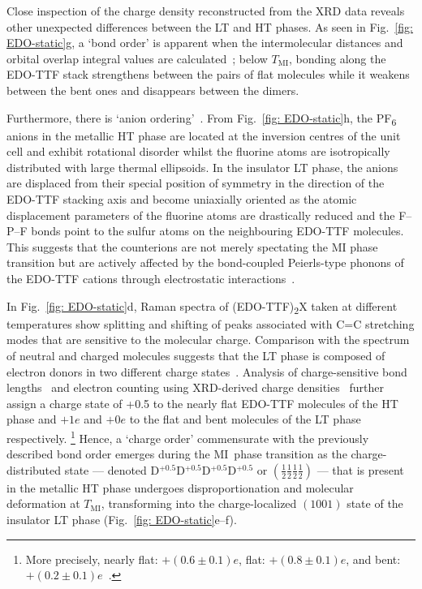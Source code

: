 Close inspection of the charge density reconstructed from the XRD data reveals
other unexpected differences between the LT and HT phases.
As seen in Fig.~\ref{fig: EDO-static}g, a `bond order' is apparent
when the intermolecular distances and orbital overlap integral values are calculated~\cite{Aoyagi2004};
below $T_\text{MI}$, bonding along the EDO-TTF stack strengthens
between the pairs of flat molecules while it weakens between the bent ones and
disappears between the dimers.

Furthermore, there is `anion ordering'~\cite{Ota2002}.
From Fig.~\ref{fig: EDO-static}h,
the PF\textsubscript{6} anions in the metallic HT phase are located at the inversion centres
of the unit cell and exhibit rotational disorder whilst the fluorine atoms are isotropically distributed
with large thermal ellipsoids.
%
In the insulator LT phase, the anions are displaced
from their special position of symmetry in the direction of the EDO-TTF stacking axis
and become uniaxially oriented as the atomic displacement parameters of the fluorine atoms
are drastically reduced and the F--P--F bonds point to the sulfur atoms on the neighbouring EDO-TTF molecules.
%
This suggests that the counterions are not merely spectating the MI phase transition
but are actively affected by the bond-coupled Peierls-type phonons of the EDO-TTF cations
through electrostatic interactions~\cite{Aoyagi2004}.

In Fig.~\ref{fig: EDO-static}d,
Raman spectra of (EDO-TTF)\textsubscript{2}X taken at different temperatures show splitting and shifting
of peaks associated with C=C stretching modes that are sensitive to the molecular charge.
Comparison with the spectrum of neutral and charged molecules suggests that the LT phase is composed of
electron donors in two different charge states~\cite{Drozdova2004}.
%
Analysis of charge-sensitive bond lengths~\cite{Ota2002} and
electron counting using XRD-derived charge densities~\cite{Aoyagi2004} further assign
a charge state of +0.5 to the nearly flat EDO-TTF molecules of the HT phase and
$+1e$ and $+0e$ to the flat and bent molecules of the LT phase respectively.%
\footnote{More precisely, nearly flat: $+(0.6 \pm 0.1)e$,
flat: $+(0.8 \pm 0.1)e$, and bent: $+(0.2 \pm 0.1)e$~\cite{Aoyagi2004}.}
%
Hence, a `charge order' commensurate with the previously described bond order
emerges during the MI~phase transition
as the charge-distributed state --- denoted D$^{+0.5}$D$^{+0.5}$D$^{+0.5}$D$^{+0.5}$ or $(\frac{1}{2} \frac{1}{2} \frac{1}{2} \frac{1}{2})$ ---
that is present in the metallic HT phase undergoes disproportionation and molecular deformation at $T_\text{MI}$,
transforming into the charge-localized $(1001)$ state of the insulator LT phase
(Fig.~\ref{fig: EDO-static}e--f).

